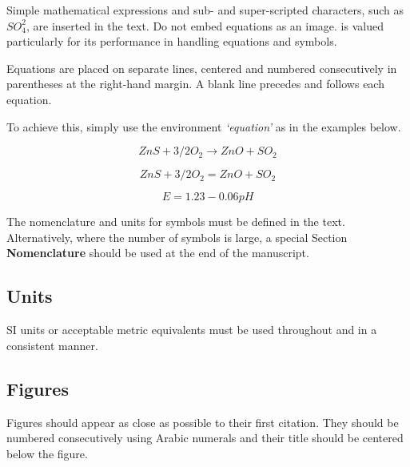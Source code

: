 \documentclass[a4paper, times, 10pt, twocolumn, twoside]{article}
\begin{document}
Simple mathematical expressions and sub- and super-scripted characters, such as $SO_4^2$, are inserted in the text. 
Do not embed equations as an image. 
 is valued particularly for its performance in handling equations and symbols.

Equations are placed on separate lines, centered and numbered consecutively in parentheses at the right-hand margin. 
A blank line precedes and follows each equation.

To achieve this, simply use the environment {\it `equation'} as in the examples below.


\begin{equation}\label{eq_1}
ZnS + 3/2O_2 \rightarrow ZnO + SO_2
\end{equation}

\begin{equation}\label{eq_2}
ZnS + 3/2O_2 = ZnO+ SO_2
\end{equation}

\begin{equation}\label{eq_3}
E = 1.23 - 0.06 pH
\end{equation}

The nomenclature and units for symbols must be defined in the text. Alternatively, where the number of symbols is large, a special Section  \textbf{Nomenclature} should be used at the end of the manuscript.

\subsection{Units}

SI units or acceptable metric equivalents must be used throughout and in a consistent manner.

\subsection{Figures}

Figures should appear as close as possible to their first citation. 
They should be numbered consecutively using Arabic numerals and their title should be centered below the figure.
\end{document}
